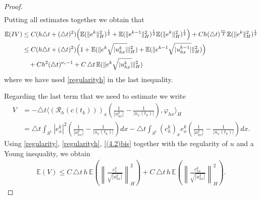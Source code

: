 \documentclass[a4paper,10pt]{article}
\numberwithin{equation}{section}
\begin{document}
\begin{proof}
\begin{align*}
\end{align*}
Putting all estimates together we obtain that 
\begin{align}\label{term-4}
\mathbb{E}(IV) &\leq C(h \triangle t + (\triangle t)^{2}) \Big{(} \mathbb{E}(\| e^{k}\|_{H}^{2})^{\frac{1}{2}} + \mathbb{E}(\| e^{k-1}\|_{H}^{2})^{\frac{1}{2}} \mathbb{E}(\| e^{k}\|_{H}^{2})^{\frac{1}{2}} \Big{)}
+ Ch (\triangle t)^{\frac{\nu_{r}}{2}} \mathbb{E}(\| e^{k}\|_{H}^{2})^{\frac{1}{2}} \notag\\
& \leq 
C(h \triangle t + (\triangle t)^{2}) \Big{(} 1 + \mathbb{E}(\| e^{k}\sqrt{|u^{k}_{hx}|} \|^{2}_{H}) + \mathbb{E}(\| e^{k-1}\sqrt{|u^{k-1}_{hx}|} \|^{2}_{H}) \Big{)}
\\
& \quad +Ch^{2} (\triangle t)^{\nu_{r}-1} + C \,\triangle t \, \mathbb{E} ( \| e^{k}\sqrt{|u^{k}_{hx}|} \|^{2}_{H}) \notag
\end{align}
where we have used \eqref{regularityh} in the last inequality.

Regarding the last term that we need to estimate we write
\begin{align*}
V&=- \triangle t \langle (\mathcal{R}_{h}(c(t_{k})))_{x} ( \frac{1}{| u^{k}_{hx}|} - \frac{1}{| u_{x}(t_{k})|}), \varphi_{hx} \rangle_{H} \\
&= \triangle t \int_{S^{1}} |e^{k}_{x}|^{2} ( \frac{1}{| u^{k}_{hx}|} - \frac{1}{| u_{x}(t_{k})|}) dx
- \triangle t \int_{S^{1}} (c^{k}_{h})_{x} e^{k}_{x}( \frac{1}{| u^{k}_{hx}|} - \frac{1}{| u_{x}(t_{k})|}) dx.
\end{align*}
Using \eqref{regularity}, \eqref{regularityh}, \eqref{(4.2)bis} together with the regularity of $u$ and a Young inequality, we obtain
\begin{align}\label{term5}
\mathbb{E}(V) \leq C \, \triangle t \, h \, \mathbb{E} \left (\left \| \frac{e_{x}^{k}}{\sqrt{|u^{k}_{hx}| } } \right \| ^{2}_{H} \right) + C \, \triangle t \, h \, \mathbb{E} \left (\left \| \frac{c^{k}_{hx}}{\sqrt{|u^{k}_{hx}| } } \right \| ^{2}_{H} \right) .
\end{align}



\end{proof}
\end{document}
